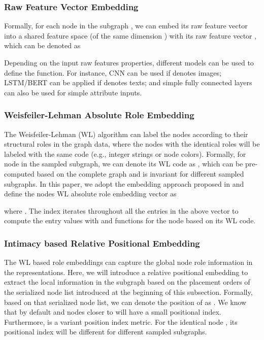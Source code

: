 \documentclass{article}
\begin{document}
\subsubsection{Raw Feature Vector Embedding}

Formally, for each node  in the subgraph , we can embed its raw feature vector into a shared feature space (of the same dimension ) with its raw feature vector , which can be denoted as

Depending on the input raw features properties, different models can be used to define the  function. For instance, CNN can be used if  denotes images; LSTM/BERT can be applied if  denotes texts; and simple fully connected layers can also be used for simple attribute inputs.


\subsubsection{Weisfeiler-Lehman Absolute Role Embedding}

The Weisfeiler-Lehman (WL) algorithm \cite{DBLP:journals/corr/NiepertAK16} can label the nodes according to their structural roles in the graph data, where the nodes with the identical roles will be labeled with the same code (e.g., integer strings or node colors). Formally, for node  in the sampled subgraph, we can denote its WL code as , which can be pre-computed based on the complete graph and is invariant for different sampled subgraphs. In this paper, we adopt the embedding approach proposed in \cite{VSPUJGKP17} and define the nodes WL absolute role embedding vector as

where . The index  iterates throughout all the entries in the above vector to compute the entry values with  and  functions for the node based on its WL code.


\subsubsection{Intimacy based Relative Positional Embedding}

The WL based role embeddings can capture the global node role information in the representations. Here, we will introduce a relative positional embedding to extract the local information in the subgraph based on the placement orders of the serialized node list introduced at the beginning of this subsection. Formally, based on that serialized node list, we can denote the position of  as . We know that  by default and nodes closer to  will have a small positional index. Furthermore,  is a variant position index metric. For the identical node , its positional index  will be different for different sampled subgraphs.
\end{document}
